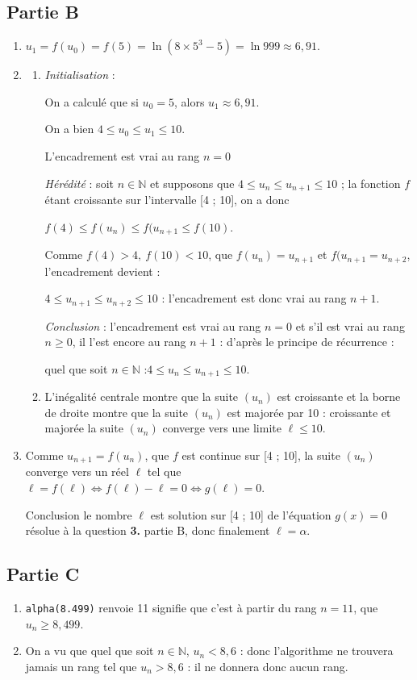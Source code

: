 \documentclass[10pt]{article}
\providecommand{\N}{\mathbb{N}}
\begin{document}
\subsection*{Partie B}
\begin{enumerate}
	\item $u_1 = f(u_0) = f(5) = \ln \left(8 \times 5^3 - 5\right) = \ln 999 \approx 6,91$.
	\item \begin{enumerate}
		\item \emph{Initialisation} :

		On a calculé que si $u_0 = 5$, alors $u_1 \approx 6,91$.

		On a bien  $4 \leqslant u_0 \leqslant u_1 \leqslant 10$.

		L'encadrement est vrai au rang $n = 0$

		\emph{Hérédité} : soit $n \in \N$ et supposons que $4 \leqslant u_n \leqslant u_{n+1} \leqslant 10$ ; la fonction $f$ étant croissante sur l'intervalle [4 ; 10], on a donc

		$f(4) \leqslant f(u_n) \leqslant f(u_{n+1} \leqslant f(10)$.

		Comme $f(4) > 4, \: f(10) < 10$, que $f(u_n) = u_{n+1}$ et $f(u_{n+1} = u_{n+2}$, l'encadrement devient :

		$4 \leqslant u_{n+1} \leqslant u_{n+2} \leqslant 10$ : l'encadrement est donc vrai au rang $n + 1$.

		\emph{Conclusion} : l'encadrement est vrai au rang $n = 0$ et s'il est vrai au rang $n \geqslant 0$, il l'est encore au rang $n + 1$ : d'après le principe de récurrence :

		quel que soit $n \in \N$ :\quad $4 \leqslant u_n \leqslant u_{n+1} \leqslant 10$.

		\item L'inégalité centrale montre que la suite $(u_n)$ est croissante et la borne de droite montre que la suite $(u_n)$ est majorée par 10 : croissante et majorée la suite $(u_n)$ converge vers une limite $\ell \leqslant 10$.
	\end{enumerate}

	\item Comme $u_{n+1} = f(u_n)$, que $f$ est continue sur [4 ; 10], la suite $(u_n)$ converge vers un réel $\ell$ tel que $\ell = f(\ell) \iff f(\ell) - \ell = 0 \iff g(\ell)  = 0$.

	Conclusion le nombre $\ell$ est solution sur [4 ; 10] de l'équation $g(x) = 0$ résolue à la question \textbf{3.} partie B, donc finalement $\ell = \alpha$.
\end{enumerate}

\subsection*{Partie C}
\begin{enumerate}
	\item \texttt{alpha(8.499)} renvoie  11 signifie que c'est à partir du rang $n = 11$, que $u_n \geqslant 8,499$.

	\item On a vu que quel que soit $n \in \N$, \: $u_n < 8,6$ : donc l'algorithme ne trouvera jamais un rang tel que $u_n > 8,6$ : il ne donnera donc aucun rang.
\end{enumerate}
\end{document}
